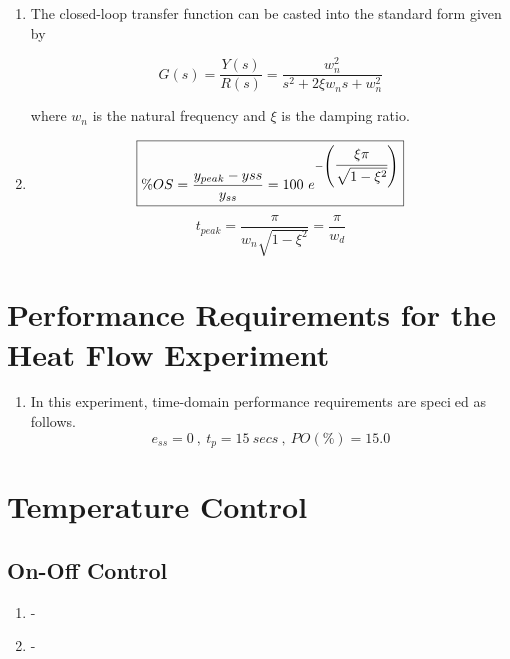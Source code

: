 \documentclass[a4paper,12pt]{article}
\begin{document}
\begin{enumerate}[resume]
		\item The closed-loop transfer function can be casted into the standard form given by
			
			$$ G(s)=\frac{Y(s)}{R(s)}=\frac{w_n^2}{s^2+2\xi w_n s + w_n^2} $$
			
			where $w_n$ is the natural frequency and $\xi$ is the damping ratio.
		
		\newpage	
			
		\item 	
			$$\boxed{ \%OS=\frac{y_{peak}-y{ss}}{y_{ss}} = 100\ e^{-\left(\cfrac{\xi \pi}{\sqrt{1- \xi^2}}	\right)} }$$
			$$\boxed{ t_{peak}=\frac{\pi}{w_n \sqrt{1- \xi^2}}=\frac{\pi}{w_d}	}$$
		 
	\end{enumerate}
	
	
\section{\large Performance Requirements for the Heat Flow Experiment}
	\begin{enumerate}[resume]
		\item In this experiment, time-domain performance requirements are specied as follows.
		$$e_{ss}=0\ ,\ t_p=15\ secs\ ,\ PO(\%)=15.0$$
	\end{enumerate}
	
	
\section{\large Temperature Control}
	\subsection{On-Off Control}
	\begin{enumerate}[resume]
		\item -
		\item -
	\end{enumerate}
	
\end{document}
